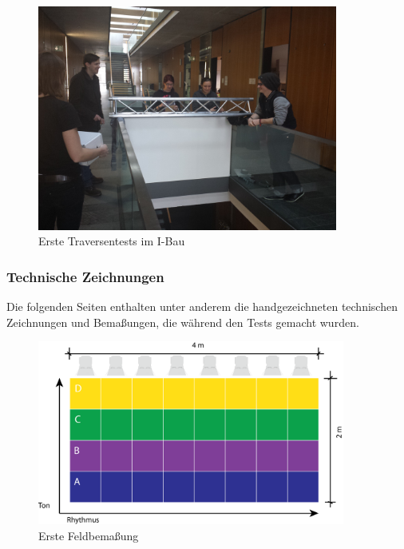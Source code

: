 \begin{figure}[htbp]
	\centering
		\includegraphics[width=0.88\textwidth]{images/Test4.jpg}
	\caption{Erste Traversentests im I-Bau}
	\label{fig:Test4}
\end{figure}
\clearpage

\subsubsection{Technische Zeichnungen}
Die folgenden Seiten enthalten unter anderem die handgezeichneten technischen Zeichnungen und Bemaßungen, die während den Tests gemacht wurden.

\begin{figure}[htbp]
	\centering
		\includegraphics[width=0.9\textwidth]{images/TZ1.png}
	\caption{Erste Feldbemaßung}
	\label{fig:TZ1}
\end{figure}

